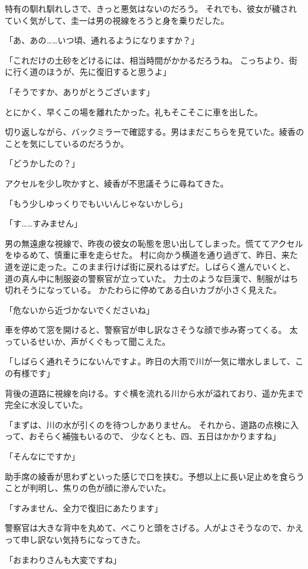 ﻿\documentclass[
    book,tate,
    line_length=30zw,
    jafontsize=12pt,
    paper=b5j,
    landscape,
    ]{jlreq}
\begin{document}
特有の馴れ馴れしさで、きっと悪気はないのだろう。
それでも、彼女が穢されていく気がして、圭一は男の視線をろうと身を乗りだした。

「あ、あの……いつ頃、通れるようになりますか？」

「これだけの土砂をどけるには、相当時間がかかるだろうね。
こっちより、街に行く道のほうが、先に復旧すると思うよ」

「そうですか、ありがとうございます」

とにかく、早くこの場を離れたかった。礼もそこそこに車を出した。

切り返しながら、バックミラーで確認する。男はまだこちらを見ていた。綾香のことを気にしているのだろうか。

「どうかしたの？」

アクセルを少し吹かすと、綾香が不思議そうに尋ねてきた。

「もう少しゆっくりでもいいんじゃないかしら」

「す……すみません」

男の無遠慮な視線で、昨夜の彼女の恥態を思い出してしまった。慌ててアクセルをゆるめて、慎重に車を走らせた。
村に向かう横道を通り過ぎて、昨日、来た道を逆に走った。このまま行けば街に戻れるはずだ。しばらく進んでいくと、
道の真ん中に制服姿の警察官が立っていた。 力士のような巨漢で、制服がはち切れそうになっている。
かたわらに停めてある白いカブが小さく見えた。

「危ないから近づかないでくださいね」

車を停めて窓を開けると、警察官が申し訳なさそうな顔で歩み寄ってくる。 
太っているせいか、声がくぐもって聞こえた。

「しばらく通れそうにないんですよ。昨日の大雨で川が一気に増水しまして、この有様です」

背後の道路に視線を向ける。すぐ横を流れる川から水が溢れており、遥か先まで完全に水没していた。

「まずは、川の水が引くのを待つしかありません。 それから、道路の点検に入って、おそらく補強もいるので、
少なくとも、四、五日はかかりますね」

「そんなにですか」

助手席の綾香が思わずといった感じで口を挟む。予想以上に長い足止めを食らうことが判明し、焦りの色が顔に滲んでいた。

「すみません、全力で復旧にあたります」

警察官は大きな背中を丸めて、ぺこりと頭をさげる。人がよさそうなので、かえって申し訳ない気持ちになってきた。

「おまわりさんも大変ですね」
\end{document}
